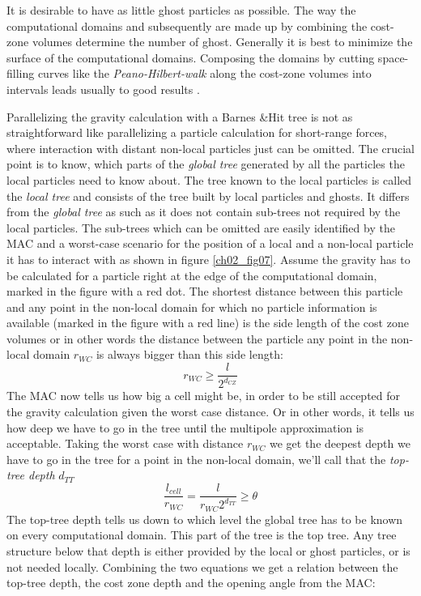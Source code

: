 It is desirable to have as little ghost particles as possible. The way the computational domains and subsequently are made up by combining the cost-zone volumes determine the number of ghost. Generally it is best to minimize the surface of the computational domains. Composing the domains by cutting space-filling curves like the \emph{Peano-Hilbert-walk} along the cost-zone volumes into intervals leads usually to good results \citep{Springel:2005p51}.

Parallelizing the gravity calculation with a  Barnes \&Hit tree is not as straightforward like parallelizing a particle calculation for short-range forces, where interaction with distant non-local particles just can be omitted. The crucial point is to know, which parts of the \emph{global tree} generated by all the particles the local particles need to know about. The tree known to the local particles is called the \emph{local tree} and consists of the tree built by local particles and ghosts. It differs from the \emph{global tree} as such as it does not contain sub-trees not required by the local particles. The sub-trees which can be omitted are easily identified by the MAC and a worst-case scenario for the position of a local and a non-local particle it has to interact with as shown in figure  \ref{ch02_fig07}. Assume the gravity has to be calculated for a particle right at the edge of the computational domain, marked in the figure with a red dot.  The shortest distance between this particle and any point in the non-local domain for which no particle information is available (marked in the figure with a red line) is the side length of the cost zone volumes or in other words the distance between the particle any point in the non-local domain $r_{WC}$ is always bigger than this side length:
\begin{equation}
r_{WC} \ge \frac{l}{2^{d_{CZ}} } 
\end{equation}
The MAC now tells us how big a cell might be, in order to be still accepted for the gravity calculation given the worst case distance. Or in other words, it tells us how deep we have to go in the tree until the multipole approximation is acceptable. Taking the worst case with distance $r_{WC}$ we get the deepest depth we have to go in the tree for a point in the non-local domain, we'll call that the \emph{top-tree depth} $d_{TT}$
\begin{equation}
\frac{l_{cell}}{r_{WC}} = \frac{l}{r_{WC} 2^{d_{TT}}} \ge \theta
\end{equation}
The top-tree depth tells us down to which level the global tree has to be known on every computational domain. This part of the tree is the top tree. Any tree structure below that depth is either provided by the local or ghost particles, or is not needed locally. Combining the two equations we get a relation between the top-tree depth, the cost zone depth and the opening angle from the MAC:
